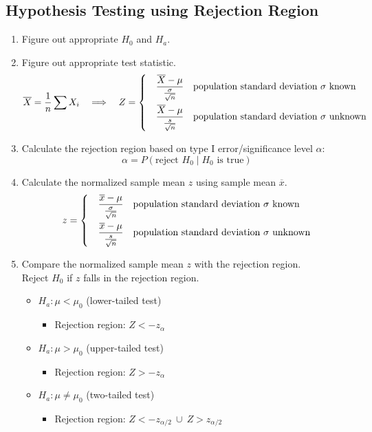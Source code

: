 \documentclass[a4paper]{article}
\begin{document}
\subsection{Hypothesis Testing using Rejection Region}
\begin{enumerate}
    \item Figure out appropriate $H_{0}$ and $H_{a}$.
    \item Figure out appropriate test statistic.
    $$\overline{X} = \frac{1}{n}\sum X_{i} \quad \Longrightarrow \quad Z =
    \begin{dcases}
    \quad \frac{\overline{X}-\mu}{\frac{\sigma}{\sqrt{n}}} &\mbox{population standard deviation $\sigma$ known}\\
    \quad \frac{\overline{X}-\mu}{\frac{s}{\sqrt{n}}} &\mbox{population standard deviation $\sigma$ unknown}
    \end{dcases}
    $$
    \item Calculate the rejection region based on type I error/significance level $\alpha$:
     $$\alpha = P(\text{reject }H_{0}\mid H_{0}\text{ is true})$$
     \item Calculate the normalized sample mean $z$ using sample mean $\overline{x}$.
     $$
     z =
    \begin{dcases}
    \quad \frac{\overline{x}-\mu}{\frac{\sigma}{\sqrt{n}}} &\mbox{population standard deviation $\sigma$ known}\\
    \quad \frac{\overline{x}-\mu}{\frac{s}{\sqrt{n}}} &\mbox{population standard deviation $\sigma$ unknown}
    \end{dcases}
    $$
    \item Compare the normalized sample mean $z$ with the rejection region.\\Reject $H_{0}$ if $z$ falls in the rejection region. 
    \begin{itemize}
        \item $H_{a}: \mu < \mu_{0}$ (lower-tailed test)
        \begin{itemize}[label=$\circ$]
            \item Rejection region: $Z < -z_{\alpha}$
        \end{itemize}
        \item $H_{a}: \mu > \mu_{0}$ (upper-tailed test)
        \begin{itemize}[label=$\circ$]
            \item Rejection region: $Z > -z_{\alpha}$
        \end{itemize}
        \item $H_{a}: \mu \neq \mu_{0}$ (two-tailed test)
        \begin{itemize}[label=$\circ$]
            \item Rejection region: $Z < -z_{\alpha/2} \ \cup  \ Z > z_{\alpha/2}$
        \end{itemize}
    \end{itemize}
\end{enumerate}
\newpage
\end{document}
